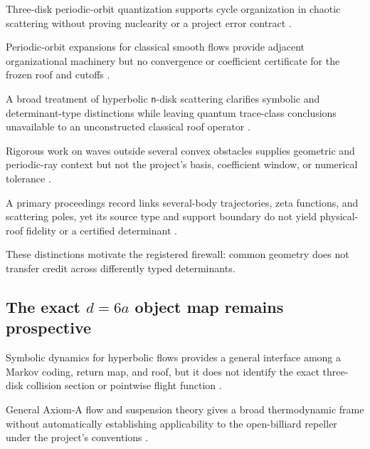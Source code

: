\documentclass[11pt,a4paper]{article}
\begin{document}
Three-disk periodic-orbit quantization supports cycle organization in chaotic scattering without proving nuclearity or a project error contract
\citep{P30-S04}.

Periodic-orbit expansions for classical smooth flows provide adjacent organizational machinery but no convergence or coefficient certificate for the frozen roof and cutoffs
\citep{P30-S05}.

A broad treatment of hyperbolic \texttt{n}-disk scattering clarifies symbolic and determinant-type distinctions while leaving quantum trace-class conclusions unavailable to an unconstructed classical roof operator
\citep{P30-S06}.

Rigorous work on waves outside several convex obstacles supplies geometric and periodic-ray context but not the project's basis, coefficient window, or numerical tolerance
\citep{P30-S09}.

A primary proceedings record links several-body trajectories, zeta functions, and scattering poles, yet its source type and support boundary do not yield physical-roof fidelity or a certified determinant
\citep{P30-S10}.

These distinctions motivate the registered firewall: common geometry does not transfer credit across differently typed determinants.

\subsection{\texorpdfstring{The exact \(d=6a\) object map remains prospective}{The exact d=6a object map remains prospective}}

Symbolic dynamics for hyperbolic flows provides a general interface among a Markov coding, return map, and roof, but it does not identify the exact three-disk collision section or pointwise flight function
\citep{P30-S07}.

General Axiom-A flow and suspension theory gives a broad thermodynamic frame without automatically establishing applicability to the open-billiard repeller under the project's conventions
\citep{P30-S08}.
\end{document}
